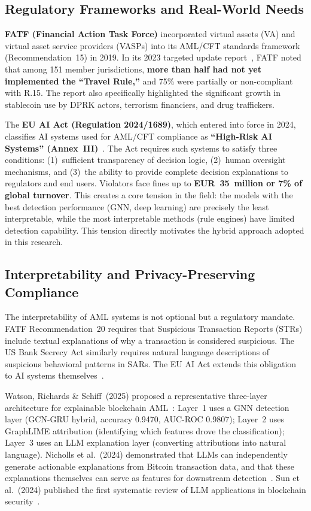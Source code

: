 \documentclass[12pt,a4paper]{article}
\begin{document}
\subsection{Regulatory Frameworks and Real-World Needs}

\textbf{FATF (Financial Action Task Force)} incorporated virtual assets (VA) and virtual asset service providers (VASPs) into its AML/CFT standards framework (Recommendation~15) in 2019. In its 2023 targeted update report~\cite{fatf2023}, FATF noted that among 151 member jurisdictions, \textbf{more than half had not yet implemented the ``Travel Rule,''} and 75\% were partially or non-compliant with R.15. The report also specifically highlighted the significant growth in stablecoin use by DPRK actors, terrorism financiers, and drug traffickers.

The \textbf{EU AI Act (Regulation 2024/1689)}, which entered into force in 2024, classifies AI systems used for AML/CFT compliance as \textbf{``High-Risk AI Systems'' (Annex~III)}~\cite{euaiact2024}. The Act requires such systems to satisfy three conditions: (1)~sufficient transparency of decision logic, (2)~human oversight mechanisms, and (3)~the ability to provide complete decision explanations to regulators and end users. Violators face fines up to \textbf{EUR~35~million or 7\% of global turnover}. This creates a core tension in the field: the models with the best detection performance (GNN, deep learning) are precisely the least interpretable, while the most interpretable methods (rule engines) have limited detection capability. This tension directly motivates the hybrid approach adopted in this research.

\subsection{Interpretability and Privacy-Preserving Compliance}

The interpretability of AML systems is not optional but a regulatory mandate. FATF Recommendation~20 requires that Suspicious Transaction Reports (STRs) include textual explanations of why a transaction is considered suspicious. The US Bank Secrecy Act similarly requires natural language descriptions of suspicious behavioral patterns in SARs. The EU AI Act extends this obligation to AI systems themselves~\cite{euaiact2024}.

Watson, Richards \& Schiff~(2025) proposed a representative three-layer architecture for explainable blockchain AML~\cite{watson2025}: Layer~1 uses a GNN detection layer (GCN-GRU hybrid, accuracy 0.9470, AUC-ROC 0.9807); Layer~2 uses GraphLIME attribution (identifying which features drove the classification); Layer~3 uses an LLM explanation layer (converting attributions into natural language). Nicholls et al.~(2024) demonstrated that LLMs can independently generate actionable explanations from Bitcoin transaction data, and that these explanations themselves can serve as features for downstream detection~\cite{nicholls2024}. Sun et al.~(2024) published the first systematic review of LLM applications in blockchain security~\cite{sun2024llm}.
\end{document}
